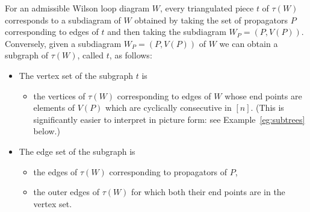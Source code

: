 \documentclass[11pt]{article}
\theoremstyle{remark}
\theoremstyle{definition}
\begin{document}
For an admissible Wilson loop diagram $W$, every triangulated piece $t$ of $\tau(W)$ corresponds to a subdiagram of $W$ obtained by taking the set of propagators $P$ corresponding to edges of $t$ and then taking the subdiagram $W_P = (P, V(P))$.  Conversely, given a subdiagram $W_P = (P, V(P))$ of $W$ we can obtain a subgraph of $\tau(W)$, called $t$, as follows:
\begin{itemize}
\item The vertex set of the subgraph $t$ is
  \begin{itemize}
  \item the vertices of $\tau(W)$ corresponding to edges of $W$ whose end points are elements of $V(P)$ which are cyclically consecutive in $[n]$. (This is significantly easier to interpret in picture form: see Example~\ref{eg:subtrees} below.)
  \end{itemize}
\item The edge set of the subgraph is
  \begin{itemize}
  \item the edges of $\tau(W)$ corresponding to propagators of $P$,
  \item the outer edges of $\tau(W)$ for which both their end points are in the vertex set.
  \end{itemize}
\end{itemize}
\end{document}
